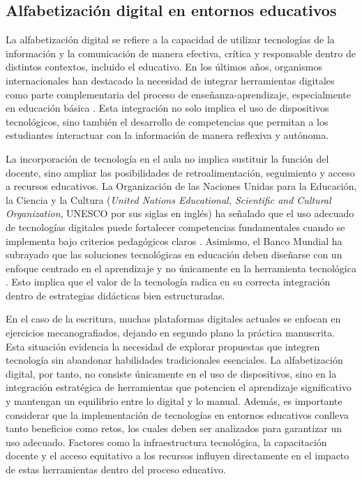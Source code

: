 \subsection{Alfabetización digital en entornos educativos}

La alfabetización digital se refiere a la capacidad de utilizar tecnologías de la información y la comunicación de manera efectiva, crítica y responsable dentro de distintos contextos, incluido el educativo. En los últimos años, organismos internacionales han destacado la necesidad de integrar herramientas digitales como parte complementaria del proceso de enseñanza-aprendizaje, especialmente en educación básica \cite{unesco2024digitallit}. Esta integración no solo implica el uso de dispositivos tecnológicos, sino también el desarrollo de competencias que permitan a los estudiantes interactuar con la información de manera reflexiva y autónoma.

La incorporación de tecnología en el aula no implica sustituir la función del docente, sino ampliar las posibilidades de retroalimentación, seguimiento y acceso a recursos educativos. La Organización de las Naciones Unidas para la Educación, la Ciencia y la Cultura (\textit{United Nations Educational, Scientific and Cultural Organization}, UNESCO por sus siglas en inglés) ha señalado que el uso adecuado de tecnologías digitales puede fortalecer competencias fundamentales cuando se implementa bajo criterios pedagógicos claros \cite{unesco2021ai}. Asimismo, el Banco Mundial ha subrayado que las soluciones tecnológicas en educación deben diseñarse con un enfoque centrado en el aprendizaje y no únicamente en la herramienta tecnológica \cite{worldbank2023reimagining}. Esto implica que el valor de la tecnología radica en su correcta integración dentro de estrategias didácticas bien estructuradas.

En el caso de la escritura, muchas plataformas digitales actuales se enfocan en ejercicios mecanografiados, dejando en segundo plano la práctica manuscrita. Esta situación evidencia la necesidad de explorar propuestas que integren tecnología sin abandonar habilidades tradicionales esenciales. La alfabetización digital, por tanto, no consiste únicamente en el uso de dispositivos, sino en la integración estratégica de herramientas que potencien el aprendizaje significativo y mantengan un equilibrio entre lo digital y lo manual.
Además, es importante considerar que la implementación de tecnologías en entornos educativos conlleva tanto beneficios como retos, los cuales deben ser analizados para garantizar un uso adecuado. Factores como la infraestructura tecnológica, la capacitación docente y el acceso equitativo a los recursos influyen directamente en el impacto de estas herramientas dentro del proceso educativo.

